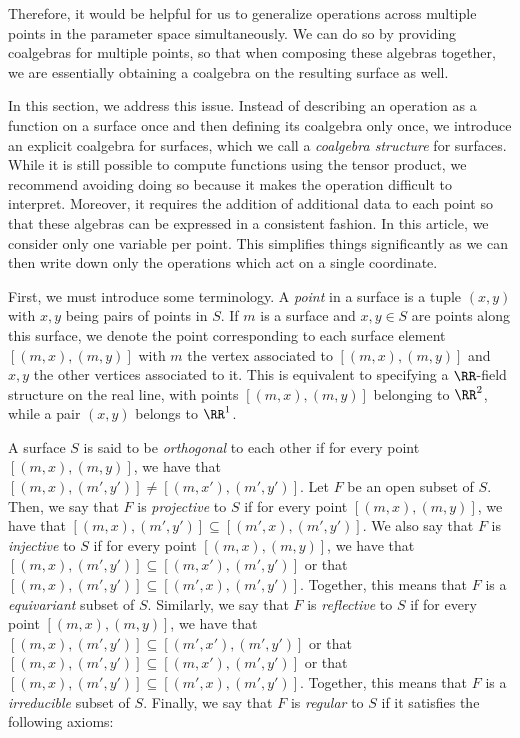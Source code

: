 \documentclass[a4paper,reqno,oneside]{article}
\begin{document}
Therefore, it would be helpful for us to generalize operations across multiple points in the parameter space simultaneously. We can do so by providing coalgebras for multiple points, so that when composing these algebras together, we are essentially obtaining a coalgebra on the resulting surface as well.

In this section, we address this issue. Instead of describing an operation as a function on a surface once and then defining its coalgebra only once, we introduce an explicit coalgebra for surfaces, which we call a \textit{coalgebra structure} for surfaces. While it is still possible to compute functions using the tensor product, we recommend avoiding doing so because it makes the operation difficult to interpret. Moreover, it requires the addition of additional data to each point so that these algebras can be expressed in a consistent fashion. In this article, we consider only one variable per point. This simplifies things significantly as we can then write down only the operations which act on a single coordinate. 

First, we must introduce some terminology. A \textit{point} in a surface is a tuple $(x,y)$ with $x,y$ being pairs of points in $S$. If $m$ is a surface and $x,y \in S$ are points along this surface, we denote the point corresponding to each surface element $[(m,x),(m,y)]$ with $m$ the vertex associated to $[(m,x),(m,y)]$ and $x,y$ the other vertices associated to it. This is equivalent to specifying a $\RR$-field structure on the real line, with points $[(m,x),(m,y)]$ belonging to $\RR^2$, while a pair $(x,y)$ belongs to $\RR^1$.

A surface $S$ is said to be \textit{orthogonal} to each other if for every point $[(m,x),(m,y)]$, we have that $[(m,x),(m',y')] \neq [(m,x'),(m',y')]$. Let $F$ be an open subset of $S$. Then, we say that $F$ is \textit{projective} to $S$ if for every point $[(m,x),(m,y)]$, we have that $[(m,x),(m',y')] \subseteq [(m',x),(m',y')]$. We also say that $F$ is \textit{injective} to $S$ if for every point $[(m,x),(m,y)]$, we have that $[(m,x),(m',y')] \subseteq [(m,x'),(m',y')]$ or that $[(m,x),(m',y')] \subseteq [(m',x),(m',y')]$. Together, this means that $F$ is a \textit{equivariant} subset of $S$. Similarly, we say that $F$ is \textit{reflective} to $S$ if for every point $[(m,x),(m,y)]$, we have that $[(m,x),(m',y')] \subseteq [(m',x'),(m',y')]$ or that $[(m,x),(m',y')] \subseteq [(m,x'),(m',y')]$ or that $[(m,x),(m',y')] \subseteq [(m',x),(m',y')]$. Together, this means that $F$ is a \textit{irreducible} subset of $S$. Finally, we say that $F$ is \textit{regular} to $S$ if it satisfies the following axioms:
\end{document}
